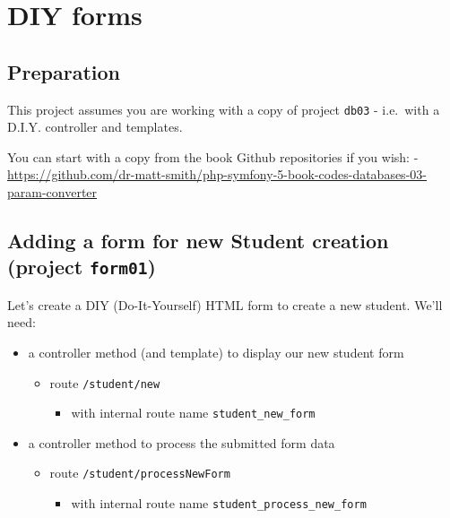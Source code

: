 \documentclass[a4paperpaper,openright]{book}
\providecommand{\tightlist}{%
  \setlength{\itemsep}{0pt}\setlength{\parskip}{0pt}}
\begin{document}
\hypertarget{diy-forms}{%
\chapter{DIY forms}\label{diy-forms}}

\hypertarget{preparation}{%
\section{Preparation}\label{preparation}}

This project assumes you are working with a copy of project
\texttt{db03} - i.e.~with a D.I.Y. controller and templates.

You can start with a copy from the book Github repositories if you wish:
-
\url{https://github.com/dr-matt-smith/php-symfony-5-book-codes-databases-03-param-converter}

\hypertarget{adding-a-form-for-new-student-creation-project-form01}{%
\section{\texorpdfstring{Adding a form for new Student creation (project
\texttt{form01})}{Adding a form for new Student creation (project form01)}}\label{adding-a-form-for-new-student-creation-project-form01}}

Let's create a DIY (Do-It-Yourself) HTML form to create a new student.
We'll need:

\begin{itemize}
\item
  a controller method (and template) to display our new student form

  \begin{itemize}
  \item
    route \texttt{/student/new}

    \begin{itemize}
    \tightlist
    \item
      with internal route name \texttt{student\_new\_form}
    \end{itemize}
  \end{itemize}
\item
  a controller method to process the submitted form data

  \begin{itemize}
  \item
    route \texttt{/student/processNewForm}

    \begin{itemize}
    \tightlist
    \item
      with internal route name \texttt{student\_process\_new\_form}
    \end{itemize}
  \end{itemize}
\end{itemize}
\end{document}
